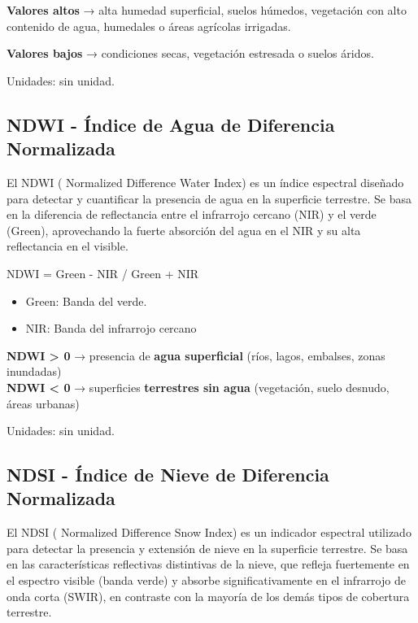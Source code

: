 \documentclass[
]{book}
\providecommand{\tightlist}{%
  \setlength{\itemsep}{0pt}\setlength{\parskip}{0pt}}
\begin{document}
\textbf{Valores altos} → alta humedad superficial, suelos húmedos, vegetación con alto contenido de agua, humedales o áreas agrícolas irrigadas.

\textbf{Valores bajos} → condiciones secas, vegetación estresada o suelos áridos.

Unidades: sin unidad.

\subsection{\texorpdfstring{\textbf{NDWI} - Índice de Agua de Diferencia Normalizada}{NDWI - Índice de Agua de Diferencia Normalizada}}\label{ndwi---uxedndice-de-agua-de-diferencia-normalizada}

El NDWI ( Normalized Difference Water Index) es un índice espectral diseñado para detectar y cuantificar la presencia de agua en la superficie terrestre. Se basa en la diferencia de reflectancia entre el infrarrojo cercano (NIR) y el verde (Green), aprovechando la fuerte absorción del agua en el NIR y su alta reflectancia en el visible.

NDWI = Green - NIR / Green + NIR\hspace{0pt}

\begin{itemize}
\tightlist
\item
  Green: Banda del verde.\\
\item
  NIR: Banda del infrarrojo cercano
\end{itemize}

\textbf{NDWI \textgreater{} 0} → presencia de \textbf{agua superficial} (ríos, lagos, embalses, zonas inundadas)\\
\textbf{NDWI \textless{} 0} → superficies \textbf{terrestres sin agua} (vegetación, suelo desnudo, áreas urbanas)

Unidades: sin unidad.

\subsection{\texorpdfstring{\textbf{NDSI} - Índice de Nieve de Diferencia Normalizada}{NDSI - Índice de Nieve de Diferencia Normalizada}}\label{ndsi---uxedndice-de-nieve-de-diferencia-normalizada}

El NDSI ( Normalized Difference Snow Index) es un indicador espectral utilizado para detectar la presencia y extensión de nieve en la superficie terrestre. Se basa en las características reflectivas distintivas de la nieve, que refleja fuertemente en el espectro visible (banda verde) y absorbe significativamente en el infrarrojo de onda corta (SWIR), en contraste con la mayoría de los demás tipos de cobertura terrestre.
\end{document}
